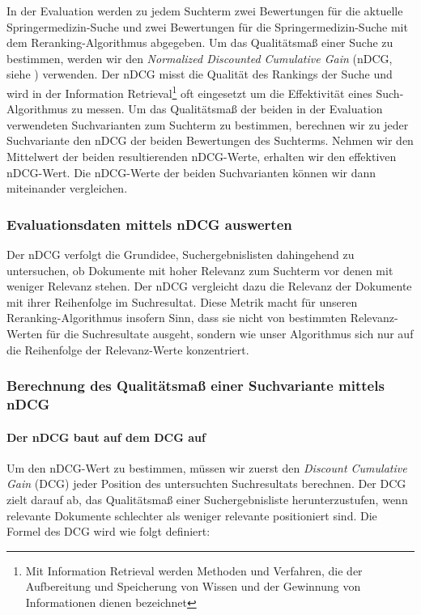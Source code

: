 In der Evaluation werden zu jedem Suchterm zwei Bewertungen für die aktuelle Springermedizin-Suche und zwei Bewertungen für die Springermedizin-Suche mit dem Reranking-Algorithmus abgegeben. Um das Qualitätsmaß einer Suche zu bestimmen, werden wir den \textit{Normalized Discounted Cumulative Gain} (nDCG, siehe \cite{nDCG}) verwenden. Der nDCG misst die Qualität des Rankings der Suche und wird in der Information Retrieval\footnote{Mit Information Retrieval werden Methoden und Verfahren, die der Aufbereitung und Speicherung von Wissen und der Gewinnung von Informationen dienen bezeichnet} oft eingesetzt um die Effektivität eines Such-Algorithmus zu messen.  Um das Qualitätsmaß der beiden in der Evaluation verwendeten Suchvarianten zum Suchterm zu bestimmen, berechnen wir zu jeder Suchvariante den nDCG der beiden Bewertungen des Suchterms. Nehmen wir den Mittelwert der beiden resultierenden nDCG-Werte, erhalten wir den effektiven nDCG-Wert. Die nDCG-Werte der beiden Suchvarianten können wir dann miteinander vergleichen.

\subsubsection{Evaluationsdaten mittels nDCG auswerten}
\label{sec:Evaluation:Aufbau:Metrik:EvaluationsdatennDCG}

Der nDCG verfolgt die Grundidee, Suchergebnislisten dahingehend zu untersuchen, ob Dokumente mit hoher Relevanz zum Suchterm vor denen mit weniger Relevanz stehen. Der nDCG vergleicht dazu die Relevanz der Dokumente mit ihrer Reihenfolge im Suchresultat. Diese Metrik macht für unseren Reranking-Algorithmus insofern Sinn, dass sie nicht von bestimmten Relevanz-Werten für die Suchresultate ausgeht, sondern wie unser Algorithmus sich nur auf die Reihenfolge der Relevanz-Werte konzentriert. 

\subsubsection{Berechnung des Qualitätsmaß einer Suchvariante mittels nDCG}
\label{sec:Evaluation:Aufbau:Metrik:BerechnungnDCG}

\paragraph{Der nDCG baut auf dem DCG auf} Um den nDCG-Wert zu bestimmen, müssen wir zuerst den \textit{Discount Cumulative Gain} (DCG) jeder Position des untersuchten Suchresultats berechnen. Der DCG zielt darauf ab, das Qualitätsmaß einer Suchergebnisliste herunterzustufen, wenn relevante Dokumente schlechter als weniger relevante positioniert sind. Die Formel des DCG wird wie folgt definiert:

